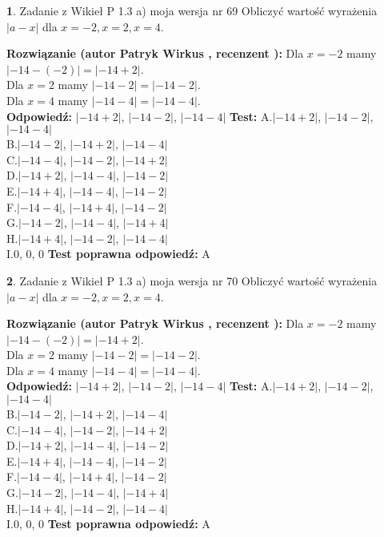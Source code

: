 \documentclass[12pt, a4paper]{article}
\theoremstyle{definition} %
\newtheorem{zad}{}
\newcommand{\zadStart}[1]{\begin{zad}#1\newline}
\newcommand{\zadStop}{\end{zad}}
\newcommand{\rozwStart}[2]{\noindent \textbf{Rozwiązanie (autor #1 , recenzent #2): }\newline}
\newcommand{\rozwStop}{\newline}
\newcommand{\odpStart}{\noindent \textbf{Odpowiedź:}\newline}
\newcommand{\odpStop}{\newline}
\newcommand{\testStart}{\noindent \textbf{Test:}\newline}
\newcommand{\testStop}{\newline}
\newcommand{\kluczStart}{\noindent \textbf{Test poprawna odpowiedź:}\newline}
\newcommand{\kluczStop}{\newline}
\begin{document}
\zadStart{Zadanie z Wikieł P 1.3 a) moja wersja nr 69}
Obliczyć wartość wyrażenia $|a - x|$ dla $x=-2,x=2,x=4$.
\zadStop
\rozwStart{Patryk Wirkus}{}
Dla $x = -2$ mamy $|-14 - (-2)| = |-14 + 2|$.\\
Dla $x = 2$ mamy $|-14 - 2| = |-14 - 2|$.\\
Dla $x = 4$ mamy $|-14 - 4| = |-14 - 4|$.\\
\rozwStop
\odpStart
$|-14 + 2|$, $|-14 - 2|$, $|-14 - 4|$
\odpStop
\testStart
A.$|-14 + 2|$, $|-14 - 2|$, $|-14 - 4|$\\
B.$|-14 - 2|$, $|-14 + 2|$, $|-14 - 4|$\\
C.$|-14 - 4|$, $|-14 - 2|$, $|-14 + 2|$\\
D.$|-14 + 2|$, $|-14 - 4|$, $|-14 - 2|$\\
E.$|-14 + 4|$, $|-14 - 4|$, $|-14 - 2|$\\
F.$|-14 - 4|$, $|-14 + 4|$, $|-14 - 2|$\\
G.$|-14 - 2|$, $|-14 - 4|$, $|-14 + 4|$\\
H.$|-14 + 4|$, $|-14 - 2|$, $|-14 - 4|$\\
I.$0$, $0$, $0$
\testStop
\kluczStart
A
\kluczStop



\zadStart{Zadanie z Wikieł P 1.3 a) moja wersja nr 70}
Obliczyć wartość wyrażenia $|a - x|$ dla $x=-2,x=2,x=4$.
\zadStop
\rozwStart{Patryk Wirkus}{}
Dla $x = -2$ mamy $|-14 - (-2)| = |-14 + 2|$.\\
Dla $x = 2$ mamy $|-14 - 2| = |-14 - 2|$.\\
Dla $x = 4$ mamy $|-14 - 4| = |-14 - 4|$.\\
\rozwStop
\odpStart
$|-14 + 2|$, $|-14 - 2|$, $|-14 - 4|$
\odpStop
\testStart
A.$|-14 + 2|$, $|-14 - 2|$, $|-14 - 4|$\\
B.$|-14 - 2|$, $|-14 + 2|$, $|-14 - 4|$\\
C.$|-14 - 4|$, $|-14 - 2|$, $|-14 + 2|$\\
D.$|-14 + 2|$, $|-14 - 4|$, $|-14 - 2|$\\
E.$|-14 + 4|$, $|-14 - 4|$, $|-14 - 2|$\\
F.$|-14 - 4|$, $|-14 + 4|$, $|-14 - 2|$\\
G.$|-14 - 2|$, $|-14 - 4|$, $|-14 + 4|$\\
H.$|-14 + 4|$, $|-14 - 2|$, $|-14 - 4|$\\
I.$0$, $0$, $0$
\testStop
\kluczStart
A
\kluczStop
\end{document}
